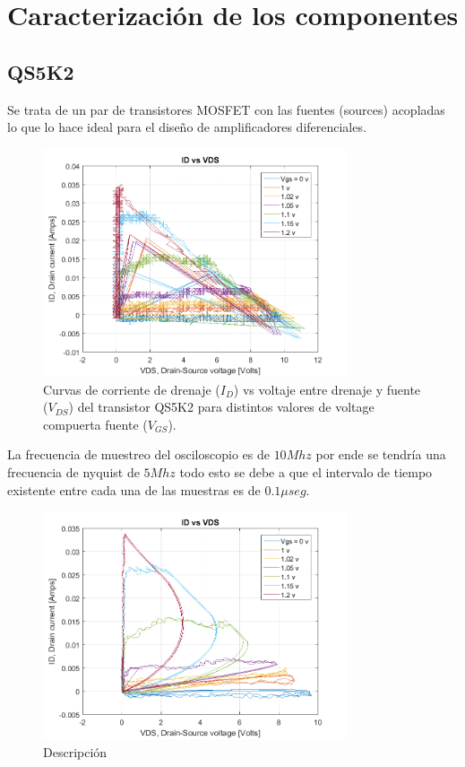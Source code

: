 \chapter{Caracterización de los componentes} 
\section{QS5K2}
Se trata de un par de transistores MOSFET con las fuentes (sources) acopladas lo que lo hace ideal para el diseño de amplificadores diferenciales.

\begin{figure}[H]
  \centering
  \includegraphics[width=0.8\textwidth]{Caracterizacion/curvaQS5K2.png}
  \caption{Curvas de corriente de drenaje ($I_D$) vs voltaje entre drenaje y fuente ($V_{DS}$) del transistor QS5K2 para distintos valores de voltage compuerta fuente ($V_{GS}$).}
  \label{signalinput} 
\end{figure}

La frecuencia de muestreo del osciloscopio es de $10 Mhz$ por ende se tendría una frecuencia de nyquist de $5 Mhz$ todo esto se debe a que el intervalo de tiempo existente entre cada una de las muestras es de $0.1\mu seg$.

\begin{figure}[H]
  \centering
  \includegraphics[width=0.8\textwidth]{Caracterizacion/curvafiltradaQS5K2.png}
  \caption{Descripción}
  \label{signalinput} 
\end{figure}

